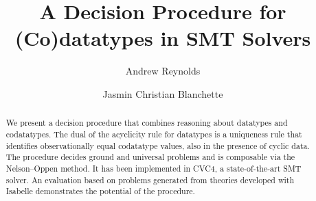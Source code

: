 \usepackage[
   a4paper,
   pdftex,
   pdftitle={A Decision Procedure for (Co)datatypes in SMT Solvers},
   pdfauthor={Andrew Reynolds and Jasmin Christian Blanchette},
   pdfkeywords={},
   pdfborder={0 0 0},
   draft=false,
   bookmarksnumbered,
   bookmarks,
   bookmarksdepth=2,
   bookmarksopenlevel=2,
   bookmarksopen]{hyperref}


\global\def\figurename{Figure}
\global\def\figuresname{Figures}


\makeatletter
\ps@myheadings
\makeatother







\title{A Decision Procedure for (Co)datatypes in SMT Solvers}

\author {Andrew Reynolds \and Jasmin Christian Blanchette}

\maketitle

\smallskipamount

\begin{nomemoriam}
\noindent\hfill\emph{\phantom{In memoriam Morgan Deters 1979--2015}}

\vspace*{-6\smallskipamount}
\end{nomemoriam}
\begin{memoriam}
\noindent\hfill\emph{}
\end{memoriam}

\begin{abstract}
We present a decision procedure that combines reasoning about
datatypes and codatatypes. The dual of the acyclicity rule for datatypes is a
uniqueness rule that identifies observationally equal codatatype values, also in the presence of
cyclic data. The procedure decides ground and universal
problems and is composable via the Nelson--Oppen method. It has been
implemented in CVC4, a state-of-the-art SMT solver. An evaluation based on
problems generated from theories developed with Isabelle demonstrates the
potential of the procedure.
\end{abstract}

